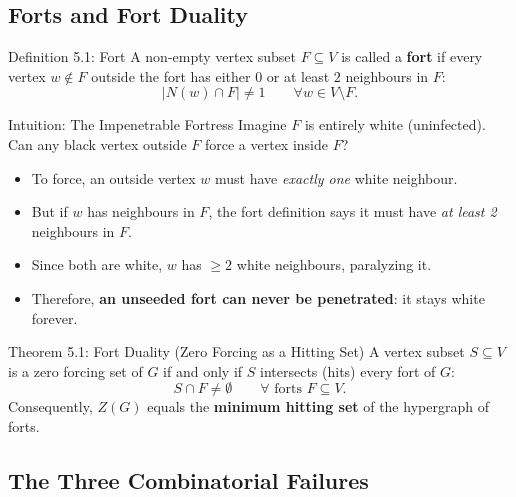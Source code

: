 \documentclass[11pt]{article}
\begin{document}
\subsection{Forts and Fort Duality}

\begin{defbox}{Definition 5.1: Fort}
A non-empty vertex subset $F \subseteq V$ is called a \textbf{fort} if every vertex $w \notin F$ outside the fort has either $0$ or at least $2$ neighbours in $F$:
\begin{equation}
  |N(w) \cap F| \ne 1 \qquad \forall w \in V \setminus F.
\end{equation}
\end{defbox}

\begin{intubox}{Intuition: The Impenetrable Fortress}
Imagine $F$ is entirely white (uninfected). Can any black vertex outside $F$ force a vertex inside $F$?
\begin{itemize}[leftmargin=*,nosep]
  \item To force, an outside vertex $w$ must have \emph{exactly one} white neighbour.
  \item But if $w$ has neighbours in $F$, the fort definition says it must have \emph{at least 2} neighbours in $F$.
  \item Since both are white, $w$ has $\ge 2$ white neighbours, paralyzing it.
  \item Therefore, \textbf{an unseeded fort can never be penetrated}: it stays white forever.
\end{itemize}
\end{intubox}

\begin{thmbox}{Theorem 5.1: Fort Duality (Zero Forcing as a Hitting Set)}
A vertex subset $S \subseteq V$ is a zero forcing set of $G$ if and only if $S$ intersects (hits) every fort of $G$:
\begin{equation}
  S \cap F \ne \emptyset \qquad \forall \text{ forts } F \subseteq V.
\end{equation}
Consequently, $Z(G)$ equals the \textbf{minimum hitting set} of the hypergraph of forts.
\end{thmbox}

\subsection{The Three Combinatorial Failures}
\end{document}
